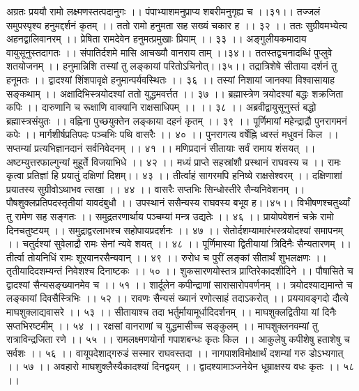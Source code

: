 अग्रतः प्रययौ रामो लक्ष्मणस्तत्पदानुगः ।।
पंपाभ्याशमनुप्राप्य शबरीमनुगृह्य च ।।३१।।
तज्जलं समुपस्पृश्य हनुमद्दर्शनं कृतम् ।।
ततो रामो हनुमता सह सख्यं चकार ह ।। ३२ ।।
ततः सुग्रीवमभ्येत्य अहनद्वालिवानरम् ।।
प्रेषिता रामदेवेन हनुमत्प्रमुखाः प्रियाम् ।। ३३ ।।
अङ्गुलीयकमादाय वायुसूनुस्तदागतः ।।
संपातिर्दशमे मासि आचख्यौ वानराय ताम् ।।३४।।
ततस्तद्वचनादब्धिं पुप्लुवे शतयोजनम् ।।
हनुमान्निशि तस्यां तु लङ्कायां परितोऽचिनोत्।।३५।।
तद्रात्रिशेषे सीताया दर्शनं तु हनूमतः ।।
द्वादश्यां शिंशपावृक्षे हनुमान्पर्यवस्थितः ।। ३६ ।।
तस्यां निशायां जानक्या विश्वासायाह सङ्कथाम् ।।
अक्षादिभिस्त्रयोदश्यां ततो युद्धमवर्त्तत ।। ३७ ।।
ब्रह्मास्त्रेण त्रयोदश्यां बद्धः शक्रजिता कपिः ।।
दारुणानि च रूक्षाणि वाक्यानि राक्षसाधिपम् ।। ।। ३८ ।।
अब्रवीद्वायुसूनुस्तं बद्धो ब्रह्मास्त्रसंयुतः ।।
वह्निना पुच्छयुक्तेन लङ्काया दहनं कृतम् ।। ३९ ।।
पूर्णिमायां महेन्द्राद्रौ पुनरागमनं कपेः ।।
मार्गशीर्षप्रतिपदः पञ्चभिः पथि वासरैः ।। ४० ।।
पुनरागत्य वर्षेह्नि ध्वस्तं मधुवनं किल ।।
सप्तम्यां प्रत्यभिज्ञानदानं सर्वनिवेदनम् ।। ४१ ।।
मणिप्रदानं सीतायाः सर्वं रामाय शंसयत् ।।
अष्टम्युत्तरफाल्गुन्यां मुहूर्ते विजयाभिधे ।। ४२ ।।
मध्यं प्राप्ते सहस्रांशौ प्रस्थानं राघवस्य च ।।
रामः कृत्वा प्रतिज्ञां हि प्रयातुं दक्षिणां दिशम्।। ४३ ।।
तीर्त्वाहं सागरमपि हनिष्ये राक्षसेश्वरम् ।।
दक्षिणाशां प्रयातस्य सुग्रीवोऽथाभव त्सखा ।। ४४ ।।
वासरैः सप्तभिः सिन्धोस्तीरे सैन्यनिवेशनम् ।।
पौषशुक्लप्रतिपदस्तृतीयां यावदंबुधौ ।।
उपस्थानं ससैन्यस्य राघवस्य बभूव ह।।४५।।
विभीषणश्चतुर्थ्यां तु रामेण सह सङ्गतः ।।
समुद्रतरणार्थाय पञ्चम्यां मन्त्र उद्यतेः ।। ४६ ।।
प्रायोपवेशनं चक्रे रामो दिनचतुष्टयम् ।।
समुद्राद्वरलाभश्च सहोपायप्रदर्शनः ।। ४७ ।।
सेतोर्दशम्यामारंभस्त्रयोदश्यां समापनम् ।।
चतुर्दश्यां सुवेलाद्रौ रामः सेनां न्यवे शयत् ।। ४८ ।।
पूर्णिमास्या द्वितीयायां त्रिदिनैः सैन्यतारणम् ।।
तीर्त्वा तोयनिधिं रामः शूरवानरसैन्यवान् ।। ४९ ।।
रुरोध च पुरीं लङ्कां सीतार्थं शुभलक्षणः ।।
तृतीयादिदशम्यन्तं निवेशश्च दिनाष्टकः ।। ५० ।।
शुकसारणयोस्तत्र प्राप्तिरेकादशीदिने ।।
पौषासिते च द्वादश्यां सैन्यसङ्ख्यानमेव च ।। ५१ ।।
शार्दूलेन कपीन्द्राणां सारासारोपवर्णनम् ।।
त्रयोदश्याद्यमान्ते च लङ्कायां दिवसैस्त्रिभिः ।। ५२ ।।
रावणः सैन्यसं ख्यानं रणोत्साहं तदाऽकरोत् ।।
प्रययावङ्गदो दौत्ये माघशुक्लाद्यवासरे ।। ५३ ।।
सीतायाश्च तदा भर्तुर्मायामूर्धादिदर्शनम् ।।
माघशुक्लद्वितीया यां दिनैः सप्तभिरष्टमीम् ।। ५४ ।।
रक्षसां वानराणां च युद्धमासीच्च सङ्कुलम् ।।
माघशुक्लनवम्यां तु रात्राविन्द्रजिता रणे ।। ५५ ।।
रामलक्ष्मणयोर्ना गपाशबन्धः कृतः किल ।।
आकुलेषु कपीशेषु हताशेषु च सर्वशः ।। ५६ ।।
वायूपदेशाद्गरुडं सस्मार राघवस्तदा ।।
नागपाशविमोक्षार्थं दशम्यां गरु डोऽभ्यगात् ।। ५७ ।।
अवहारो माघशुक्लैस्यैकादश्यां दिनद्वयम् ।।
द्वादश्यामाञ्जनेयेन धूम्राक्षस्य वधः कृतः ।। ५८ ।।
